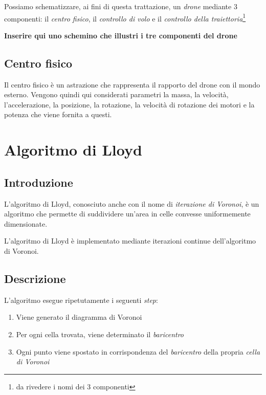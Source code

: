 \documentclass[10pt,a4paper]{article}
\begin{document}
Possiamo schematizzare, ai fini di questa trattazione, un \textit{drone} mediante 3 componenti: il \textit{centro fisico}, il \textit{controllo di volo} e il \textit{controllo della traiettoria}\footnote{da rivedere i nomi dei 3 componenti}

\begin{center}
\textbf{Inserire qui uno schemino che illustri i tre componenti del drone}
\end{center}

\subsection{Centro fisico}

Il centro fisico è un astrazione che rappresenta il rapporto del drone con il mondo esterno. Vengono quindi qui considerati parametri la massa, la velocità, l'accelerazione, la posizione, la rotazione, la velocità di rotazione dei motori e la potenza che viene fornita a questi.

\section{Algoritmo di Lloyd}

\subsection{Introduzione}

L'algoritmo di Lloyd, conosciuto anche con il nome di \textit{iterazione di Voronoi}, è un algoritmo che permette di suddividere un'area in celle convesse uniformemente dimensionate.

L'algoritmo di Lloyd è implementato mediante iterazioni continue dell'algoritmo di Voronoi.

\subsection{Descrizione}

L'algoritmo esegue ripetutamente i seguenti \textit{step}:

\begin{enumerate}
	\item Viene generato il diagramma di Voronoi
	\item Per ogni cella trovata, viene determinato il \textit{baricentro}
	\item Ogni punto viene spostato in corrispondenza del \textit{baricentro} della propria \textit{cella di Voronoi}
\end{enumerate}
\end{document}
